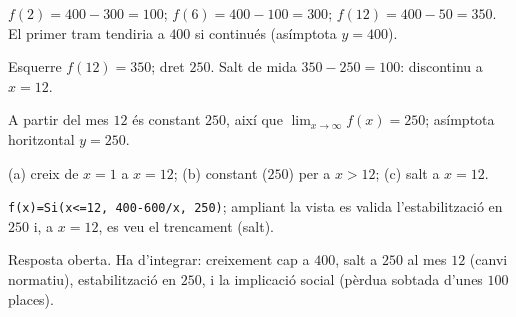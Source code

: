 \begin{solucions}
\begin{sollist}
  \item $f(2)=400-300=100$; $f(6)=400-100=300$; $f(12)=400-50=350$. El primer tram
        tendiria a $400$ si continués (asímptota $y=400$).
  \item Esquerre $f(12)=350$; dret $250$. Salt de mida $350-250=100$: discontinu a
        $x=12$.
  \item A partir del mes $12$ és constant $250$, així que
        $\displaystyle\lim_{x\to\infty}f(x)=250$; asímptota horitzontal $y=250$.
  \item (a) creix de $x=1$ a $x=12$; (b) constant ($250$) per a $x>12$; (c) salt a
        $x=12$.
  \item \texttt{f(x)=Si(x<=12, 400-600/x, 250)}; ampliant la vista es valida
        l'estabilització en $250$ i, a $x=12$, es veu el trencament (salt).
  \item Resposta oberta. Ha d'integrar: creixement cap a $400$, salt a $250$ al mes
        $12$ (canvi normatiu), estabilització en $250$, i la implicació social (pèrdua
        sobtada d'unes $100$ places).
\end{sollist}
\end{solucions}
